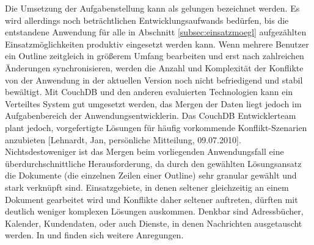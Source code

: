 Die Umsetzung der Aufgabenstellung kann als gelungen bezeichnet werden. Es wird allerdings noch beträchtlichen Entwicklungsaufwands bedürfen, bis die entstandene Anwendung für alle in Abschnitt \ref{subsec:einsatzmoegl} aufgezählten Einsatzmöglichkeiten produktiv eingesetzt werden kann. Wenn mehrere Benutzer ein Outline zeitgleich in größerem Umfang bearbeiten und erst nach zahlreichen Änderungen synchronisieren, werden die Anzahl und Komplexität der Konflikte von der Anwendung in der aktuellen Version noch nicht befriedigend und stabil bewältigt. Mit CouchDB und den anderen evaluierten Technologien kann ein Verteiltes System gut umgesetzt werden, das Mergen der Daten liegt jedoch im Aufgabenbereich der Anwendungsentwicklerin. Das CouchDB Entwicklerteam plant jedoch, vorgefertigte Lösungen für häufig vorkommende Konflikt-Szenarien anzubieten [Lehnardt, Jan, persönliche Mitteilung, 09.07.2010]. Nichtsdestoweniger ist das Mergen beim vorliegenden Anwendungsfall eine überdurchschnittliche Herausforderung, da durch den gewählten Lösungsansatz die Dokumente (die einzelnen Zeilen einer Outline) sehr granular gewählt und stark verknüpft sind. Einsatzgebiete, in denen seltener gleichzeitig an einem Dokument gearbeitet wird und Konflikte daher seltener auftreten, dürften mit deutlich weniger komplexen Lösungen auskommen. Denkbar sind Adressbücher, Kalender, Kundendaten, oder auch Dienste, in denen Nachrichten ausgetauscht werden. In  und \cite{couch:whatsnew} finden sich weitere Anregungen.

